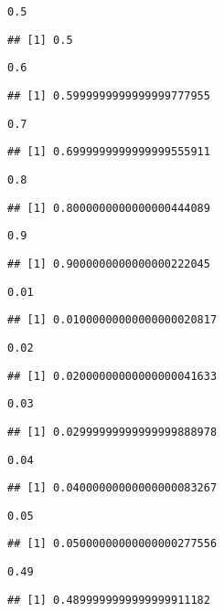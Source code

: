 \documentclass{article}\usepackage[]{graphicx}\usepackage[]{color}
\makeatletter
\newcommand{\hlnum}[1]{\textcolor[rgb]{0.686,0.059,0.569}{#1}}%
\newenvironment{kframe}{%
 \def\at@end@of@kframe{}%
 \ifinner\ifhmode%
  \def\at@end@of@kframe{\end{minipage}}%
  \begin{minipage}{\columnwidth}%
 \fi\fi%
 \def\FrameCommand##1{\hskip\@totalleftmargin \hskip-\fboxsep
 \colorbox{shadecolor}{##1}\hskip-\fboxsep
     \hskip-\linewidth \hskip-\@totalleftmargin \hskip\columnwidth}%
 \MakeFramed {\advance\hsize-\width
   \@totalleftmargin\z@ \linewidth\hsize
   \@setminipage}}%
 {\par\unskip\endMakeFramed%
 \at@end@of@kframe}
\newenvironment{knitrout}{}{} %
\makeatother
\begin{document}
\begin{knitrout}
\begin{kframe}
\begin{alltt}
\hlnum{0.5}
\end{alltt}
\begin{verbatim}
## [1] 0.5
\end{verbatim}
\begin{alltt}
\hlnum{0.6}
\end{alltt}
\begin{verbatim}
## [1] 0.5999999999999999777955
\end{verbatim}
\begin{alltt}
\hlnum{0.7}
\end{alltt}
\begin{verbatim}
## [1] 0.6999999999999999555911
\end{verbatim}
\begin{alltt}
\hlnum{0.8}
\end{alltt}
\begin{verbatim}
## [1] 0.8000000000000000444089
\end{verbatim}
\begin{alltt}
\hlnum{0.9}
\end{alltt}
\begin{verbatim}
## [1] 0.9000000000000000222045
\end{verbatim}
\begin{alltt}
\hlnum{0.01}
\end{alltt}
\begin{verbatim}
## [1] 0.01000000000000000020817
\end{verbatim}
\begin{alltt}
\hlnum{0.02}
\end{alltt}
\begin{verbatim}
## [1] 0.02000000000000000041633
\end{verbatim}
\begin{alltt}
\hlnum{0.03}
\end{alltt}
\begin{verbatim}
## [1] 0.02999999999999999888978
\end{verbatim}
\begin{alltt}
\hlnum{0.04}
\end{alltt}
\begin{verbatim}
## [1] 0.04000000000000000083267
\end{verbatim}
\begin{alltt}
\hlnum{0.05}
\end{alltt}
\begin{verbatim}
## [1] 0.05000000000000000277556
\end{verbatim}
\begin{alltt}
\hlnum{0.49}
\end{alltt}
\begin{verbatim}
## [1] 0.4899999999999999911182
\end{verbatim}
\end{kframe}
\end{knitrout}
\end{document}
